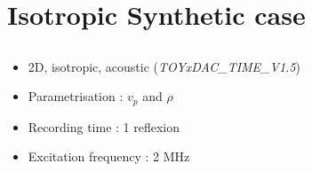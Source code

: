 \documentclass[10pt,xcolor=x11names,compress, notes=show]{beamer}%
\begin{document}
%	
%	
%


\section{Isotropic Synthetic case}
\subsection*{}
\begin{frame}{\insertsectionhead}
	\begin{itemize}
		\item<1-> 2D, isotropic, acoustic (\emph{TOYxDAC\_TIME\_V1.5})
		\item<1-> Parametrisation : $v_{p}$ and $\rho$
		\item Recording time : 1 reflexion
		\item<2-> Excitation frequency : 2 MHz
	\end{itemize}
	

\end{frame}
\end{document}
